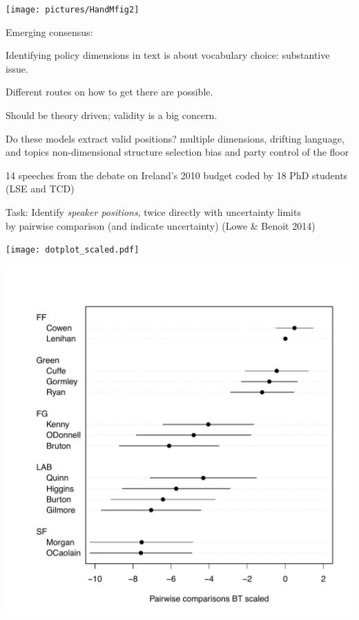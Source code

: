 \documentclass{mediumfoils}
\newcommand{\mkgrey}[1]{{\color{pale}#1}}
\begin{document}

\centerline{\texttt{[image: pictures/HandMfig2]}}




Emerging consensus: \vspace{0.2cm}

Identifying  policy dimensions in text is about vocabulary choice: substantive issue.

Different routes on how to get there are possible. 

Should be theory driven; validity is a big concern. 





Do these models extract valid positions?
\ita
\itm multiple dimensions, drifting language, and topics
\itm non-dimensional structure
\itm selection bias and party control of the floor
\itz

%


14 speeches from the debate on Ireland's 2010 budget coded by 18 PhD students (LSE and TCD)

{Task}: Identify \textit{speaker positions}, twice
\ita
\itm directly with uncertainty limits \\
by pairwise comparison (and indicate uncertainty)
\itz
\mkgrey{(Lowe \& Benoit 2014)}


\centerline{\texttt{[image: dotplot\_scaled.pdf]}}


\centerline{\includegraphics[scale=.7]{less-ugly}}
\end{document}
